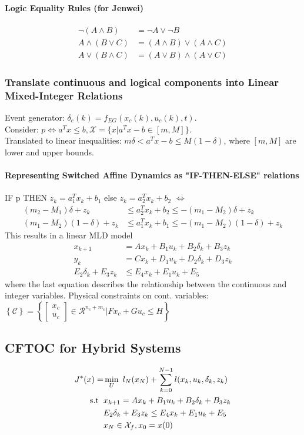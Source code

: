 \documentclass[landscape,a4paper,8pt]{scrartcl}
\newcommand{\mc}[1]{\mathcal{#1}}
\newcommand{\Me}[1]{\begin{bmatrix}#1\end{bmatrix}} %
\begin{document}
\begin{multicols*}{3}
\paragraph{Logic Equality Rules (for Jenwei)}
\begin{align*}
 \neg (A \wedge B) & = \neg A \vee \neg B \\
A \wedge (B \vee C) & = (A \wedge B) \vee (A\wedge C) \\
A \vee (B \wedge C) & = (A\vee B)\wedge (A \vee C)
\end{align*}

\subsubsection{Translate continuous and logical components into Linear Mixed-Integer Relations}
Event generator: $\delta_e(k) = f_{EG}(x_c(k), u_c(k), t)$. \\
Consider: $p \Leftrightarrow a^Tx \leq b, \mathcal X = \{x | a^T x-b \in [m, M]\}$. \\
Translated to linear inequalities: $ m \delta < a^T x-b \leq M(1-\delta)$, where $[m, M]$ are lower and upper bounds. \\
\paragraph{Representing Switched Affine Dynamics as "IF-THEN-ELSE" relations}
IF p THEN $z_k = a_1^Tx_k+b_1$ else $z_k = a_2^Tx_k+b_2$ $\Leftrightarrow$
\begin{align*}
(m_2 - M_1)\delta + z_k &\leq a_2^T x_k + b_2 \leq - (m_1 - M_2)\delta + z_k \\
(m_1 - M_2)(1 -\delta) + z_k &\leq a_1^T x_k + b_1 \leq -(m_1 - M_2)(1 -\delta) + z_k
\end{align*}
This results in a linear MLD model
\begin{align*}
x_{k+1} &= A x_k + B_1 u_k + B_2 \delta_k + B_3 z_k \\
y_k &= C x_k  + D_1 u_k + D_2 \delta_k + D_3 z_k\\
E_2 \delta_k + E_3 z_k &\leq E_4 x_k + E_1 u_k + E_5
\end{align*}
where the last equation describes the relationship between the continuous and integer variables. Physical constraints on cont. variables:
$\left\{\mc{C}\right\} = \left\{ \Me{x_c\\u_c} \in \mc{R}^{n_c+m_c}| F x_c + G u_c \leq H\right\}$
\subsection{CFTOC for Hybrid Systems}
\begin{align*}
J^*(x)=&\min_U ~l_N (x_N) + \sum_{k=0}^{N-1} l(x_k,u_k,\delta_k,z_k)\\
\mathrm{s.t} \hspace*{2mm} & x_{k+1}=A x_k + B_1 u_k + B_2 \delta_k + B_3 z_k\\ &E_2 \delta_k + E_3 z_k \leq E_4 x_k + E_1 u_k + E_5\\&x_N \in \mc{X}_f, x_0 = x(0)
\end{align*}

\end{multicols*}
\end{document}

